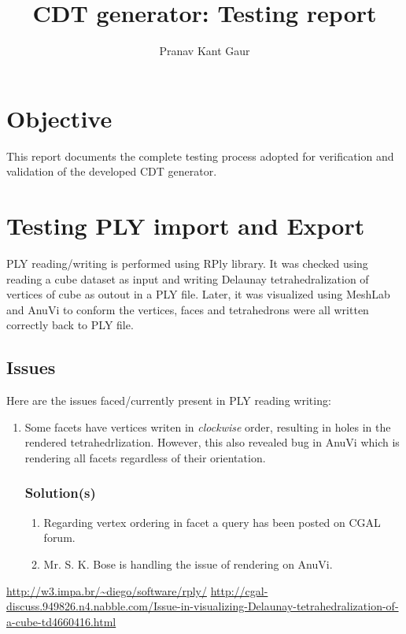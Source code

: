 \documentclass{article}
\begin{document}
\title{CDT generator: Testing report}
\author{Pranav Kant Gaur}
\maketitle

\section{Objective}
This report documents the complete testing process adopted for verification and validation of the developed CDT generator.

\section{Testing PLY import and Export}
PLY reading/writing is performed using RPly\cite{rply} library. It was checked using reading a cube dataset as input and writing Delaunay tetrahedralization of vertices of cube as outout in a PLY file. Later, it was visualized using MeshLab and AnuVi to conform the vertices, faces and tetrahedrons were all written correctly back to PLY file.

\subsection{Issues}
Here are the issues faced/currently present in PLY reading writing:
\begin{enumerate}
\item Some facets have vertices writen in \textit{clockwise} order, resulting in holes in the rendered tetrahedrlization. However, this also revealed bug in AnuVi which is rendering all facets regardless of their orientation.
\subsubsection{Solution(s)}
\begin{enumerate}
\item Regarding vertex ordering in facet a query\cite{cgalForumMessage1} has been posted on CGAL forum.
\item Mr. S. K. Bose is handling the issue of rendering on AnuVi.	
\end{enumerate}
\end{enumerate}		

\begin{thebibliography}{1}
\url{http://w3.impa.br/~diego/software/rply/}	
\url{http://cgal-discuss.949826.n4.nabble.com/Issue-in-visualizing-Delaunay-tetrahedralization-of-a-cube-td4660416.html}	

\end{thebibliography}
\end{document}
